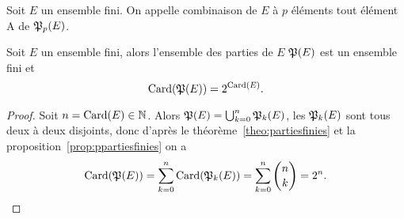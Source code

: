 \begin{defdef}
  Soit $E$ un ensemble fini. On appelle combinaison de $E$ à $p$ éléments tout élément A de $\mathfrak{P}_p(E)$.
\end{defdef}
\begin{prop}
  Soit $E$ un ensemble fini, alors l'ensemble des parties de $E$ $\mathfrak{P}(E)$ est un ensemble fini et
  \begin{equation}
    \operatorname{Card}(\mathfrak{P}(E))=2^{\operatorname{Card}(E)}.
  \end{equation}
\end{prop}
\begin{proof}
  Soit $n=\operatorname{Card}(E)\in \mathbb{N}$. Alors $\mathfrak{P}(E)=\bigcup_{k=0}^{n}\mathfrak{P}_k(E)$, les $\mathfrak{P}_k(E)$ sont tous deux à deux disjoints, donc d'après le théorème~\ref{theo:partiesfinies} et la proposition~\ref{prop:ppartiesfinies} on a
  \begin{equation}
    \operatorname{Card}(\mathfrak{P}(E))=\sum_{k=0}^n \operatorname{Card}(\mathfrak{P}_k(E))=\sum_{k=0}^n \binom{n}{k}=2^n.
  \end{equation}
\end{proof}
